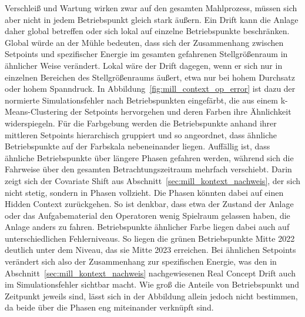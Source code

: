 Verschleiß und Wartung wirken zwar auf den gesamten Mahlprozess, müssen sich aber nicht in jedem Betriebspunkt gleich stark äußern. Ein Drift kann die Anlage daher global betreffen oder sich lokal auf einzelne Betriebspunkte beschränken. Global würde an der Mühle bedeuten, dass sich der Zusammenhang zwischen Setpoints und spezifischer Energie im gesamten gefahrenen Stellgrößenraum in ähnlicher Weise verändert. Lokal wäre der Drift dagegen, wenn er sich nur in einzelnen Bereichen des Stellgrößenraums äußert, etwa nur bei hohem Durchsatz oder hohem Spanndruck. In Abbildung~\ref{fig:mill_context_op_error} ist dazu der normierte Simulationsfehler nach Betriebspunkten eingefärbt, die aus einem k-Means-Clustering der Setpoints hervorgehen und deren Farben ihre Ähnlichkeit widerspiegeln. Für die Farbgebung werden die Betriebspunkte anhand ihrer mittleren Setpoints hierarchisch gruppiert und so angeordnet, dass ähnliche Betriebspunkte auf der Farbskala nebeneinander liegen. Auffällig ist, dass ähnliche Betriebspunkte über längere Phasen gefahren werden, während sich die Fahrweise über den gesamten Betrachtungszeitraum mehrfach verschiebt. Darin zeigt sich der Covariate Shift aus Abschnitt~\ref{sec:mill_kontext_nachweis}, der sich nicht stetig, sondern in Phasen vollzieht. Die Phasen könnten dabei auf einen Hidden Context zurückgehen. So ist denkbar, dass etwa der Zustand der Anlage oder das Aufgabematerial den Operatoren wenig Spielraum gelassen haben, die Anlage anders zu fahren. Betriebspunkte ähnlicher Farbe liegen dabei auch auf unterschiedlichen Fehlerniveaus. So liegen die grünen Betriebspunkte Mitte 2022 deutlich unter dem Niveau, das sie Mitte 2023 erreichen. Bei ähnlichen Setpoints verändert sich also der Zusammenhang zur spezifischen Energie, was den in Abschnitt~\ref{sec:mill_kontext_nachweis} nachgewiesenen Real Concept Drift auch im Simulationsfehler sichtbar macht. Wie groß die Anteile von Betriebspunkt und Zeitpunkt jeweils sind, lässt sich in der Abbildung allein jedoch nicht bestimmen, da beide über die Phasen eng miteinander verknüpft sind. \par
%
